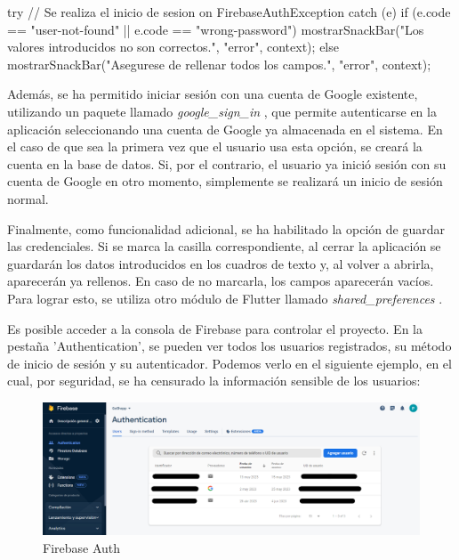 \documentclass{article}
\begin{document}
\vspace{0.5cm}
\begin{codigo}
try {
    // Se realiza el inicio de sesion
} on FirebaseAuthException catch (e) {
    if (e.code == "user-not-found" || e.code == "wrong-password")
    {
      mostrarSnackBar("Los valores introducidos no son correctos.", "error",
      context);
    }
    else
    {
      mostrarSnackBar("Asegurese de rellenar todos los campos.", "error",
      context);
    }
}
\end{codigo}

Además, se ha permitido iniciar sesión con una cuenta de Google existente, utilizando un paquete llamado \textit{google\_sign\_in} \cite{Google Sign In}, que permite autenticarse en la aplicación seleccionando una cuenta de Google ya almacenada en el sistema. En el caso de que sea la primera vez que el usuario usa esta opción, se creará la cuenta en la base de datos. Si, por el contrario, el usuario ya inició sesión con su cuenta de Google en otro momento, simplemente se realizará un inicio de sesión normal.

Finalmente, como funcionalidad adicional, se ha habilitado la opción de guardar las credenciales. Si se marca la casilla correspondiente, al cerrar la aplicación se guardarán los datos introducidos en los cuadros de texto y, al volver a abrirla, aparecerán ya rellenos. En caso de no marcarla, los campos aparecerán vacíos. Para lograr esto, se utiliza otro módulo de Flutter llamado \textit{shared\_preferences} \cite{Shared Preferences}.

Es posible acceder a la consola de Firebase para controlar el proyecto. En la pestaña 'Authentication', se pueden ver todos los usuarios registrados, su método de inicio de sesión y su autenticador. Podemos verlo en el siguiente ejemplo, en el cual, por seguridad, se ha censurado la información sensible de los usuarios:

\begin{figure}[h]
    \centering
    \includegraphics[width=1\textwidth]{imagenes/firebase_auth.png}
    \caption{Firebase Auth}
\end{figure}
\end{document}

